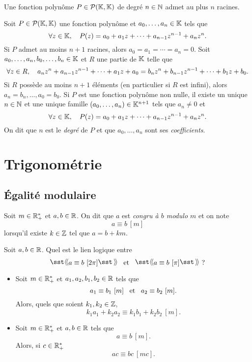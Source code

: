 \documentclass{magnolia}
\begin{document}
  \begin{proposition}
  Une fonction polynôme $P\in\mathcal{P}(\mathbb{K},\mathbb{K})$ de degré $n\in\mathbb{N}$ admet au plus $n$ racines.
  \end{proposition}
  
  \begin{remarques}
  \remarque Soit $P\in\mathcal{P}(\mathbb{K},\mathbb{K})$ une fonction polynôme et
   $a_0,\ldots,a_n\in\mathbb{K}$ tels que
    \[\forall z\in\mathbb{K},\quad P(z)=a_0+a_1 z+\cdots+a_{n-1}z^{n-1}+a_n z^n.\]
    Si $P$ admet au moins $n+1$ racines, alors $a_0=a_1=\cdots=a_n=0$.
  \remarque Soit $a_0,\ldots,a_n,b_0,\ldots,b_n\in\mathbb{K}$ et $R$ une partie de
   $\mathbb{K}$ telle que
    \[\forall z\in R,\quad 
    a_n z^n+a_{n-1}z^{n-1}+\cdots+a_1 z+a_0=b_n z^n+b_{n-1}z^{n-1}+\cdots+b_1 z+b_0.\]
    Si $R$ possède au moins $n+1$ éléments (en particulier si $R$ est infini), alors $a_n=b_n, \ldots, a_0=b_0$.
\remarque Si $P$ est une fonction polynôme non nulle, il
  existe un unique $n\in\mathbb{N}$ et une unique famille $(a_0,\ldots,a_n)\in\mathbb{K}^{n+1}$
  tels que $a_n\neq 0$ et
  \[\forall z\in\mathbb{K},\quad P(z)=a_0 + a_1 z + \cdots +  a_{n-1} z^{n-1} + a_n z^n.\]
  On dit que $n$ est le \emph{degré} de $P$ et que $a_0,\ldots,a_n$ sont ses
  \emph{coefficients}.
  \end{remarques}

\section{Trigonométrie}

\subsection{Égalité modulaire}

\begin{definition}
Soit $m\in\mathbb{R}_+^*$ et $a,b\in\mathbb{R}$. On dit que $a$ est \emph{congru à $b$ modulo $m$} et on note
\[a\equiv b\ [m]\]
lorsqu'il existe $k\in\mathbb{Z}$ tel que $a=b+km$.
\end{definition}

\begin{exoUnique}
\exo Soit $a,b\in\mathbb{R}$. Quel est le lien logique entre
  \[\text{\og}a\equiv b\ [2\pi]\text{\fg} \et \text{\og}a\equiv b\ [\pi]\text{\fg} \text{ ?}\]
\end{exoUnique}

\begin{proposition}
\begin{itemize}
\item 
Soit $m\in\mathbb{R}_+^*$ et $a_1,a_2,b_1,b_2\in\mathbb{R}$ tels que
  \[a_1\equiv b_1\ [m] \et a_2\equiv b_2\ [m].\]
Alors, quels que soient $k_1,k_2\in\mathbb{Z}$,
  \[k_1 a_1+k_2 a_2\equiv k_1 b_1+k_2 b_2\ [m].\]
\item Soit $m\in\mathbb{R}_+^*$ et $a,b\in\mathbb{R}$ tels que
  \[a\equiv b\ [m].\]
  Alors, si $c\in\mathbb{R}_+^*$
  \[ac\equiv bc\ [m c].\]
\end{itemize}
\end{proposition}
\end{document}
